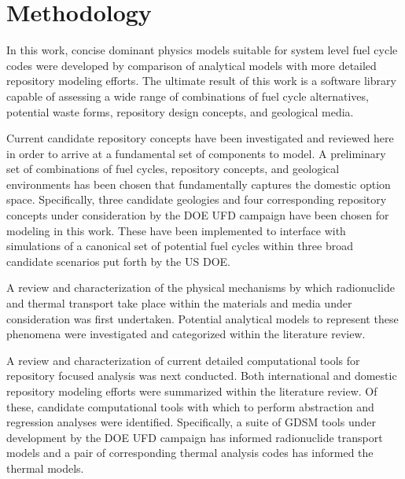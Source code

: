 \section{Methodology} 


In this work, concise dominant physics models suitable for system level fuel 
cycle codes were developed by comparison of analytical models with more 
detailed repository modeling efforts. The ultimate result of this work is a 
software library capable of assessing a wide range of combinations 
of fuel cycle alternatives, potential waste forms, repository design concepts, 
and geological media. 


Current candidate repository concepts have been investigated and reviewed here 
in order to arrive at a fundamental set of components to model. A preliminary 
set of combinations of fuel cycles, repository concepts, and geological 
environments has 
been chosen that fundamentally captures the domestic option space. 
Specifically, three candidate geologies and four corresponding repository 
concepts under consideration by the \gls{DOE} \gls{UFD} campaign have been 
chosen for modeling in this work. These have been implemented to interface
with \Cyclus simulations of a canonical set of potential fuel cycles within 
three broad candidate scenarios put forth by the \gls{US} \gls{DOE}.



A review and characterization of the physical mechanisms by which radionuclide 
and thermal transport take place within the materials and media under 
consideration was first undertaken. Potential analytical models to represent  
these phenomena were investigated and categorized within the literature review. 


A review and characterization of current detailed computational tools for
repository focused analysis was next conducted. Both international and domestic
repository modeling efforts were summarized within the literature review. Of 
these, candidate computational tools with which to perform abstraction and 
regression analyses were identified. Specifically, a suite of \gls{GDSM} tools 
under development by the \gls{DOE} \gls{UFD} campaign has informed radionuclide 
transport models and a pair of corresponding thermal analysis codes has 
informed the thermal models.
 
